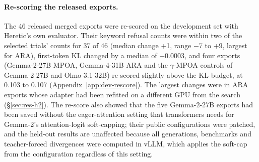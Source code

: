 \paragraph{Re-scoring the released exports.} The 46 released merged exports were
re-scored on the development set with Heretic's own evaluator. Their keyword
refusal counts were within two of the selected trials' counts for 37 of 46
(median change +1, range $-$7 to +9, largest for ARA), first-token KL changed
by a median of +0.0003, and four exports (Gemma-2-27B MPOA, Gemma-4-31B ARA
and the $\gamma$-MPOA controls of Gemma-2-27B and Olmo-3.1-32B) re-scored
slightly above the KL budget, at 0.103 to 0.107
(Appendix~\ref{app:dev-rescore}). The largest changes were in ARA exports
whose adapter had been refitted on a different GPU from the search
(\S\ref{sec:res-h2}). The re-score also showed that the five
Gemma-2-27B exports had been saved without the eager-attention setting that
transformers needs for Gemma-2's attention-logit soft-capping; their public
configurations were patched, and the held-out results are unaffected because
all generations, benchmarks and teacher-forced divergences were computed in
vLLM, which applies the soft-cap from the configuration regardless of this
setting.



